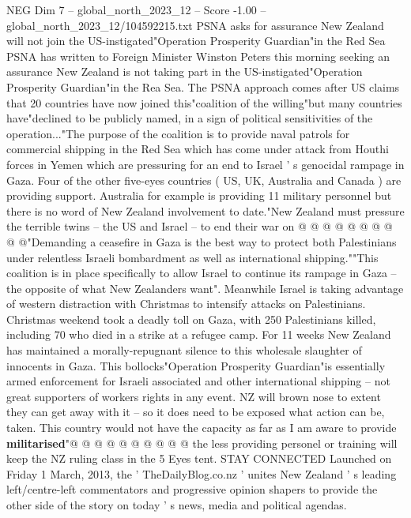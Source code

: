 \begin{textsample}{NEG Dim 7 – global\_north\_2023\_12 – Score -1.00 – global\_north\_2023\_12/104592215.txt}  \label{ex:f7_neg_305}
PSNA asks for assurance New Zealand will not join the US-instigated"Operation Prosperity Guardian"in the Red Sea PSNA has written to Foreign Minister Winston Peters this morning seeking an assurance New Zealand is not taking part in the US-instigated"Operation Prosperity Guardian"in the Rea Sea.
The PSNA approach comes after US claims that 20 countries have now joined this"coalition of the willing"but many countries have"declined to be publicly named, in a sign of political sensitivities of the operation..."The purpose of the coalition is to provide naval patrols for commercial shipping in the Red Sea which has come under attack from Houthi forces in Yemen which are pressuring for an end to Israel ' s genocidal rampage in Gaza.
Four of the other five-eyes countries ( US, UK, Australia and Canada ) are providing support.
Australia for example is providing 11 military personnel but there is no word of New Zealand involvement to date."New Zealand must pressure the terrible twins -- the US and Israel -- to end their war on @ @ @ @ @ @ @ @ @ @"Demanding a ceasefire in Gaza is the best way to protect both Palestinians under relentless Israeli bombardment as well as international shipping.""This coalition is in place specifically to allow Israel to continue its rampage in Gaza -- the opposite of what New Zealanders want".
Meanwhile Israel is taking advantage of western distraction with Christmas to intensify attacks on Palestinians.
Christmas weekend took a deadly toll on Gaza, with 250 Palestinians killed, including 70 who died in a strike at a refugee camp.
For 11 weeks New Zealand has maintained a morally-repugnant silence to this wholesale slaughter of innocents in Gaza.
This bollocks"Operation Prosperity Guardian"is essentially armed enforcement for Israeli associated and other international shipping -- not great supporters of workers rights in any event.
NZ will brown nose to extent they can get away with it -- so it does need to be exposed what action can be, taken.
This country would not have the capacity as far as I am aware to provide \textbf{militarised}"@ @ @ @ @ @ @ @ @ @ the less providing personel or training will keep the NZ ruling class in the 5 Eyes tent.
STAY CONNECTED Launched on Friday 1 March, 2013, the ' TheDailyBlog.co.nz ' unites New Zealand ' s leading left/centre-left commentators and progressive opinion shapers to provide the other side of the story on today ' s news, media and political agendas.

\end{textsample}
